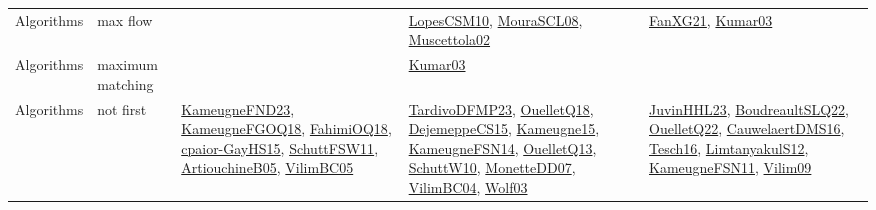 {\begin{longtable}{llp{6cm}p{6cm}p{6cm}}
Algorithms & max flow &  & \href{articles/LopesCSM10.pdf}{LopesCSM10}\cite{LopesCSM10}, \href{papers/MouraSCL08.pdf}{MouraSCL08}\cite{MouraSCL08}, \href{papers/Muscettola02.pdf}{Muscettola02}\cite{Muscettola02} & \href{articles/FanXG21.pdf}{FanXG21}\cite{FanXG21}, \href{papers/Kumar03.pdf}{Kumar03}\cite{Kumar03}\\
Algorithms & maximum matching &  & \href{papers/Kumar03.pdf}{Kumar03}\cite{Kumar03} & \\
Algorithms & not first & \href{papers/KameugneFND23.pdf}{KameugneFND23}\cite{KameugneFND23}, \href{papers/KameugneFGOQ18.pdf}{KameugneFGOQ18}\cite{KameugneFGOQ18}, \href{articles/FahimiOQ18.pdf}{FahimiOQ18}\cite{FahimiOQ18}, \href{papers/cpaior-GayHS15.pdf}{cpaior-GayHS15}\cite{cpaior-GayHS15}, \href{articles/SchuttFSW11.pdf}{SchuttFSW11}\cite{SchuttFSW11}, \href{papers/ArtiouchineB05.pdf}{ArtiouchineB05}\cite{ArtiouchineB05}, \href{articles/VilimBC05.pdf}{VilimBC05}\cite{VilimBC05} & \href{papers/TardivoDFMP23.pdf}{TardivoDFMP23}\cite{TardivoDFMP23}, \href{papers/OuelletQ18.pdf}{OuelletQ18}\cite{OuelletQ18}, \href{papers/DejemeppeCS15.pdf}{DejemeppeCS15}\cite{DejemeppeCS15}, \href{articles/Kameugne15.pdf}{Kameugne15}\cite{Kameugne15}, \href{articles/KameugneFSN14.pdf}{KameugneFSN14}\cite{KameugneFSN14}, \href{papers/OuelletQ13.pdf}{OuelletQ13}\cite{OuelletQ13}, \href{papers/SchuttW10.pdf}{SchuttW10}\cite{SchuttW10}, \href{papers/MonetteDD07.pdf}{MonetteDD07}\cite{MonetteDD07}, \href{papers/VilimBC04.pdf}{VilimBC04}\cite{VilimBC04}, \href{papers/Wolf03.pdf}{Wolf03}\cite{Wolf03} & \href{papers/JuvinHHL23.pdf}{JuvinHHL23}\cite{JuvinHHL23}, \href{papers/BoudreaultSLQ22.pdf}{BoudreaultSLQ22}\cite{BoudreaultSLQ22}, \href{papers/OuelletQ22.pdf}{OuelletQ22}\cite{OuelletQ22}, \href{papers/CauwelaertDMS16.pdf}{CauwelaertDMS16}\cite{CauwelaertDMS16}, \href{papers/Tesch16.pdf}{Tesch16}\cite{Tesch16}, \href{articles/LimtanyakulS12.pdf}{LimtanyakulS12}\cite{LimtanyakulS12}, \href{papers/KameugneFSN11.pdf}{KameugneFSN11}\cite{KameugneFSN11}, \href{papers/Vilim09.pdf}{Vilim09}\cite{Vilim09}\\

\end{longtable}}
